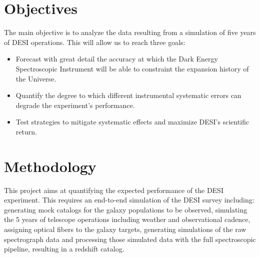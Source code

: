 \documentclass[12pt]{article}
\begin{document}
 




\section*{Objectives}

The main objective is to analyze the data resulting from a simulation
of five years of DESI operations.  
This will allow us to reach three goals:

\begin{itemize}
\item Forecast with great detail the accuracy at which the Dark Energy
  Spectroscopic Instrument will be able to constraint the expansion
  history of the Universe.  
\item Quantify the degree to which different instrumental systematic
  errors can degrade the experiment's performance.
\item Test strategies to mitigate systematic effects and maximize
  DESI's scientific return.
\end{itemize}


\section*{Methodology}


This project aims at quantifying the expected performance of the DESI
experiment. 
This requires an end-to-end simulation of the DESI survey including:
generating mock catalogs for the galaxy populations to be
  observed, simulating the 5 years of telescope operations including
  weather and observational cadence, assigning optical fibers to the
  galaxy targets, generating simulations of the raw spectrograph data and
  processing those simulated data with the full spectroscopic
  pipeline, resulting in a redshift catalog. 
\end{document}
